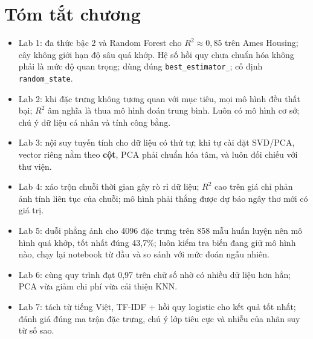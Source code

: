 \section{Tóm tắt chương}
\begin{itemize}
    \item Lab 1: đa thức bậc 2 và Random Forest cho $R^2 \approx 0{,}85$ trên Ames Housing; cây không giới hạn độ sâu quá khớp. Hệ số hồi quy chưa chuẩn hóa không phải là mức độ quan trọng; dùng đúng \texttt{best\_estimator\_}; cố định \texttt{random\_state}.
    \item Lab 2: khi đặc trưng không tương quan với mục tiêu, mọi mô hình đều thất bại; $R^2$ âm nghĩa là thua mô hình đoán trung bình. Luôn có mô hình cơ sở; chú ý dữ liệu cá nhân và tính công bằng.
    \item Lab 3: nội suy tuyến tính cho dữ liệu có thứ tự; khi tự cài đặt SVD/PCA, vector riêng nằm theo \textbf{cột}, PCA phải chuẩn hóa tâm, và luôn đối chiếu với thư viện.
    \item Lab 4: xáo trộn chuỗi thời gian gây rò rỉ dữ liệu; $R^2$ cao trên giá chỉ phản ánh tính liên tục của chuỗi; mô hình phải thắng được dự báo ngây thơ mới có giá trị.
    \item Lab 5: duỗi phẳng ảnh cho 4096 đặc trưng trên 858 mẫu huấn luyện nên mô hình quá khớp, tốt nhất đúng 43,7\%; luôn kiểm tra biến đang giữ mô hình nào, chạy lại notebook từ đầu và so sánh với mức đoán ngẫu nhiên.
    \item Lab 6: cùng quy trình đạt 0,97 trên chữ số nhờ có nhiều dữ liệu hơn hẳn; PCA vừa giảm chi phí vừa cải thiện KNN.
    \item Lab 7: tách từ tiếng Việt, TF-IDF + hồi quy logistic cho kết quả tốt nhất; đánh giá đúng ma trận đặc trưng, chú ý lớp tiêu cực và nhiễu của nhãn suy từ số sao.
\end{itemize}

